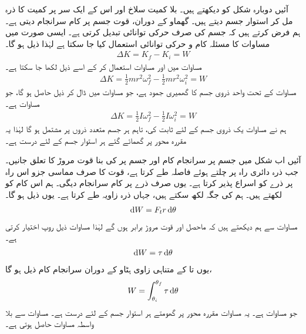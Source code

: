 آئیں دوبارہ شکل    کو دیکھتے ہیں۔ بلا کمیت     سلاخ  اور اس کے ایک سر پر  کمیت   کا ذرہ مل کر استوار جسم دیتے ہیں۔ گھماو کے دوران، قوت  جسم پر کام سرانجام دیتی ہے۔ ہم فرض کرتے ہیں کہ  جسم کی صرف حرکی توانائی تبدیل کرتی ہے۔ ایسی صورت میں مساوات  کا  مسئلہ کام و حرکی توانائی  استعمال کیا جا سکتا ہے لہٰذا ذیل ہو گا۔
\begin{align}\label{مساوات_گھماو_مساوات_کے_ثبوت_الف}
\Delta K=K_f-K_i=W
\end{align}
مساوات  میں   اور  مساوات   استعمال  کر  کے اسے ذیل لکھا جا سکتا ہے۔
\begin{align}\label{مساوات_گھماو_مساوات_کے_ثبوت_ب}
\Delta K=\tfrac{1}{2}mr^2\omega_f^2-\tfrac{1}{2}mr^2\omega_i^2=W
\end{align}
مساوات  کے تحت  واحد  ذروی جسم کا گھمیری جمود  ہے، جو  مساوات  میں ڈال کر ذیل حاصل ہو گا، جو مساوات  ہے۔
\begin{align*}
\Delta K=\tfrac{1}{2}I\omega_f^2-\tfrac{1}{2}I\omega_i^2=W
\end{align*}
ہم نے مساوات یک   ذروی جسم کے لئے ثابت کی، تاہم ہر جسم متعدد ذروں پر مشتمل ہو گا لہٰذا یہ مقررہ محور پر  گھمائے گئے ہر استوار جسم  کے لئے درست ہے۔

آئیں اب شکل   میں جسم  پر سرانجام کام  اور جسم پر   کی بنا قوت مروڑ  کا  تعلق  جانیں۔ جب ذرہ دائری راہ پر چلتے ہوئے  فاصلہ طے کرتا ہے، قوت کا صرف مماسی جزو  اس راہ پر ذرے کو اسراع پذیر کرتا ہے۔ یوں صرف  ذرے پر کام سرانجام  دیگی۔ ہم اس کام  کو  لکھتے ہیں۔ ہم  کی جگہ  لکھ سکتے ہیں، جہاں  ذرہ زاویہ  طے کرتا ہے۔  یوں ذیل ہو گا۔
\begin{align}\label{مساوات_گھماو_کام_تفرقی_الف}
\dif W=F_t r\dif\theta
\end{align}
مساوات  سے  ہم دیکھتے ہیں کہ ماحصل  اور قوت مروڑ  برابر ہوں گے لہٰذا  مساوات  ذیل روپ اختیار کرتی ہے۔
\begin{align}\label{مساوات_گھماو_کام_تفرقی_ج}
\dif W=\tau\dif\theta
\end{align}
یوں  تا  کے  متناہی زاوی ہٹاو کے دوران سرانجام کام ذیل ہو گا، 
\begin{align*}
W=\int_{\theta_i}^{\theta_f}\tau\dif\theta
\end{align*}
جو مساوات  ہے۔ یہ مساوات مقررہ محور پر  گھومتے ہر استوار جسم کے لئے درست ہے۔ مساوات   سے بلا واسطہ مساوات  حاصل ہوتی ہے۔

